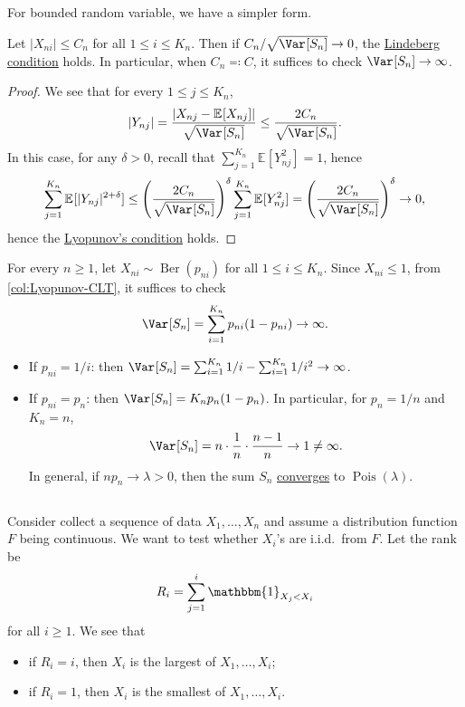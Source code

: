 For bounded random variable, we have a simpler form.

\begin{corollary}\label{col:Lyopunov-CLT}
	Let \(\vert X_{ni} \vert \leq C_n\) for all \(1 \leq i \leq K_n\). Then if \(C_n / \sqrt{\Var_{}[S_n] } \to 0\), the \hyperref[def:Lindeberg-condition]{Lindeberg condition} holds. In particular, when \(C_n \eqqcolon C\), it suffices to check \(\Var_{}[S_n] \to \infty \).
\end{corollary}
\begin{proof}
	We see that for every \(1 \leq j \leq K_n\),
	\[
		\vert Y_{nj} \vert
		= \frac{\vert X_{nj} - \mathbb{E}_{}[X_{nj}] \vert }{\sqrt{\Var_{}[S_n] } }
		\leq \frac{2 C_n}{\sqrt{\Var_{}[S_n] } }.
	\]
	In this case, for any \(\delta > 0\), recall that \(\sum_{j=1}^{K_n} \mathbb{E}_{}[Y_{nj}^2] = 1\), hence
	\[
		\sum_{j=1}^{K_n} \mathbb{E}_{}[\vert Y_{nj} \vert ^{2 + \delta }]
		\leq \left( \frac{2C_n}{\sqrt{\Var_{}[S_n] } } \right) ^\delta \sum_{j=1}^{K_n} \mathbb{E}_{}[Y_{nj}^2]
		= \left( \frac{2C_n}{\sqrt{\Var_{}[S_n] } } \right) ^\delta
		\to 0,
	\]
	hence the \hyperref[thm:Lyopunov-CLT]{Lyopunov's condition} holds.
\end{proof}

\begin{eg}\label{eg:Lyopunov-CLT}
	For every \(n \geq 1\), let \(X_{ni} \sim \operatorname{Ber}(p_{ni}) \) for all \(1 \leq i \leq K_n\). Since \(X_{ni} \leq 1\), from \autoref{col:Lyopunov-CLT}, it suffices to check
	\[
		\Var_{}[S_n]
		= \sum_{i=1}^{K_n} p_{ni} (1 - p_{ni}) \to \infty .
	\]
	\begin{itemize}
		\item If \(p_{ni} = 1 / i\): then \(\Var_{}[S_n] = \sum_{i=1}^{K_n} 1 / i - \sum_{i=1}^{K_n} 1 / i^2 \to \infty \).
		\item If \(p_{ni} = p_n\): then \(\Var_{}[S_n] = K_n p_n (1 - p_n)\). In particular, for \(p_n = 1 / n\) and \(K_n = n\),
		      \[
			      \Var_{}[S_n]
			      = n \cdot \frac{1}{n} \cdot \frac{n-1}{n}
			      \to 1
			      \neq \infty .
		      \]
		      In general, if \(n p_n \to \lambda > 0\), then the sum \(S_n\) \hyperref[def:converge-in-distribution]{converges} to \(\operatorname{Pois}(\lambda ) \).
	\end{itemize}
\end{eg}

\subsection{}
Consider collect a sequence of data \(X_1, \dots , X_n\) and assume a distribution function \(F\) being continuous. We want to test whether \(X_i\)'s are i.i.d.\ from \(F\). Let the rank be
\[
	R_i = \sum_{j=1}^{i} \mathbbm{1}_{X_j < X_i}
\]
for all \(i \geq 1\). We see that
\begin{itemize}
	\item if \(R_i = i\), then \(X_i\) is the largest of \(X_1, \dots , X_i\);
	\item if \(R_i = 1\), then \(X_i\) is the smallest of \(X_1, \dots , X_i\).
\end{itemize}

